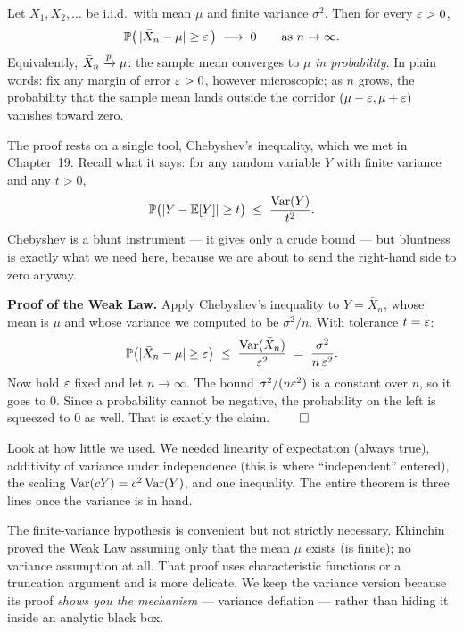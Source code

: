 \begin{theorem}
\label{ch20:thm-wlln}
Let $X_1, X_2, \dots$ be i.i.d.\ with mean $\mu$ and finite variance $\sigma^2$. Then for every $\varepsilon > 0$,
\[
  \operatorname{\mathbb{P}}\bigl(\,\lvert\bar X_n - \mu\rvert \ge \varepsilon\,\bigr) \;\longrightarrow\; 0 \qquad \text{as } n \to \infty.
\]
Equivalently, $\bar X_n \xrightarrow{p} \mu$: the sample mean converges to $\mu$ \emph{in probability}. In plain words: fix any margin of error $\varepsilon > 0$, however microscopic; as $n$ grows, the probability that the sample mean lands outside the corridor $(\mu-\varepsilon, \mu+\varepsilon)$ vanishes toward zero.
\end{theorem}

The proof rests on a single tool, Chebyshev's inequality, which we met in Chapter~19. Recall what it says: for any random variable $Y$ with finite variance and any $t > 0$,
\[
  \operatorname{\mathbb{P}}\bigl(\lvert Y - \operatorname{\mathbb{E}}[Y]\rvert \ge t\bigr) \;\le\; \frac{\operatorname{Var}(Y)}{t^2}.
\]
Chebyshev is a blunt instrument --- it gives only a crude bound --- but bluntness is exactly what we need here, because we are about to send the right-hand side to zero anyway.

\begin{whybox}
\textbf{Proof of the Weak Law.} Apply Chebyshev's inequality to $Y = \bar X_n$, whose mean is $\mu$ and whose variance we computed to be $\sigma^2/n$. With tolerance $t = \varepsilon$:
\[
  \operatorname{\mathbb{P}}\bigl(\lvert\bar X_n - \mu\rvert \ge \varepsilon\bigr) \;\le\; \frac{\operatorname{Var}(\bar X_n)}{\varepsilon^2} \;=\; \frac{\sigma^2}{n\,\varepsilon^2}.
\]
Now hold $\varepsilon$ fixed and let $n \to \infty$. The bound $\sigma^2/(n\varepsilon^2)$ is a constant over $n$, so it goes to $0$. Since a probability cannot be negative, the probability on the left is squeezed to $0$ as well. That is exactly the claim. $\qed$
\end{whybox}

Look at how little we used. We needed linearity of expectation (always true), additivity of variance under independence (this is where ``independent'' entered), the scaling $\operatorname{Var}(cY)=c^2\operatorname{Var}(Y)$, and one inequality. The entire theorem is three lines once the variance is in hand.

\begin{remark}
The finite-variance hypothesis is convenient but not strictly necessary. Khinchin proved the Weak Law assuming only that the mean $\mu$ exists (is finite); no variance assumption at all. That proof uses characteristic functions or a truncation argument and is more delicate. We keep the variance version because its proof \emph{shows you the mechanism} --- variance deflation --- rather than hiding it inside an analytic black box.
\end{remark}

